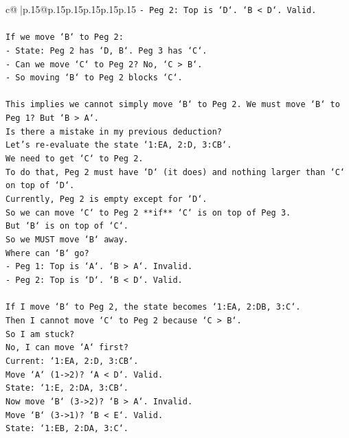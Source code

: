 \documentclass{article}
\begin{document}
{\begin{supertabular}{c@{$\;$}|p{.15\linewidth}@{}p{.15\linewidth}p{.15\linewidth}p{.15\linewidth}p{.15\linewidth}p{.15\linewidth}}
{{{\texttt{{-} Peg 2: Top is `D`. `B < D`. Valid.} \\
\\ 
\texttt{If we move `B` to Peg 2:} \\
\texttt{{-} State: Peg 2 has `D, B`. Peg 3 has `C`.} \\
\texttt{{-} Can we move `C` to Peg 2? No, `C > B`.} \\
\texttt{{-} So moving `B` to Peg 2 blocks `C`.} \\
\\ 
\texttt{This implies we cannot simply move `B` to Peg 2. We must move `B` to Peg 1? But `B > A`.} \\
\texttt{Is there a mistake in my previous deduction?} \\
\texttt{Let's re{-}evaluate the state `1:EA, 2:D, 3:CB`.} \\
\texttt{We need to get `C` to Peg 2.} \\
\texttt{To do that, Peg 2 must have `D` (it does) and nothing larger than `C` on top of `D`.} \\
\texttt{Currently, Peg 2 is empty except for `D`.} \\
\texttt{So we can move `C` to Peg 2 **if** `C` is on top of Peg 3.} \\
\texttt{But `B` is on top of `C`.} \\
\texttt{So we MUST move `B` away.} \\
\texttt{Where can `B` go?} \\
\texttt{{-} Peg 1: Top is `A`. `B > A`. Invalid.} \\
\texttt{{-} Peg 2: Top is `D`. `B < D`. Valid.} \\
\\ 
\texttt{If I move `B` to Peg 2, the state becomes `1:EA, 2:DB, 3:C`.} \\
\texttt{Then I cannot move `C` to Peg 2 because `C > B`.} \\
\texttt{So I am stuck?} \\
\texttt{No, I can move `A` first?} \\
\texttt{Current: `1:EA, 2:D, 3:CB`.} \\
\texttt{Move `A` (1{-}>2)? `A < D`. Valid.} \\
\texttt{State: `1:E, 2:DA, 3:CB`.} \\
\texttt{Now move `B` (3{-}>2)? `B > A`. Invalid.} \\
\texttt{Move `B` (3{-}>1)? `B < E`. Valid.} \\
\texttt{State: `1:EB, 2:DA, 3:C`.} \\
}}}
\end{supertabular}}
\end{document}
